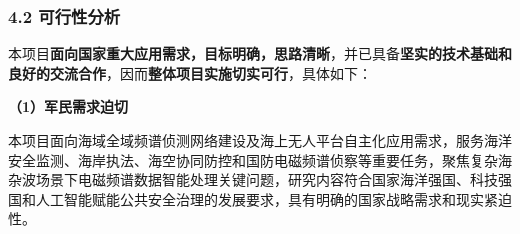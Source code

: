 \subsubsection{4.2 可行性分析}

{\kaishu
	本项目\textbf{面向国家重大应用需求，目标明确，思路清晰}，并已具备\textbf{坚实的技术基础和良好的交流合作}，因而\textbf{整体项目实施切实可行}，具体如下：
	
	\textbf{（1）军民需求迫切}
	
	本项目面向海域全域频谱侦测网络建设及海上无人平台自主化应用需求，服务海洋安全监测、海岸执法、海空协同防控和国防电磁频谱侦察等重要任务，聚焦复杂海杂波场景下电磁频谱数据智能处理关键问题，研究内容符合国家海洋强国、科技强国和人工智能赋能公共安全治理的发展要求，具有明确的国家战略需求和现实紧迫性。

	
	

}
